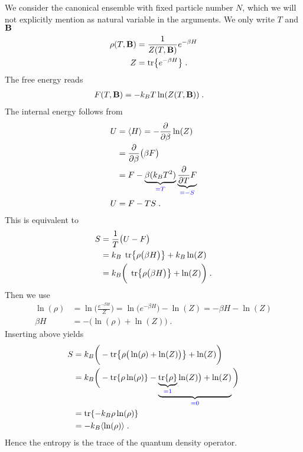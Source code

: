 We consider the canonical ensemble with fixed particle number $N$, which we will not explicitly mention as natural variable in the arguments. We only write $T$ and $\mathbf B$
%
\begin{align*}
\rho(T,\mathbf B) &= \frac{1}{Z(T,\mathbf B)} e^{-\beta H}\\
Z &= \tr{e^{-\beta H}}\;.
\end{align*}
%
The free energy reads
%
\begin{align}\label{eq:}
F(T,\mathbf B) &= -k_{B} T \ln(Z(T,\mathbf B))\;.
\end{align}
%
The internal energy follows from
%
\begin{align*}
U &=\langle H \rangle = -\frac{\partial }{\partial \beta} \ln(Z)\\
&= \frac{\partial }{\partial \beta} \big(\beta F\big) \\
&= F  - \underbrace{
\beta (k_{B}T^{2})
}_{\color{blue} = T}\underbrace{
\frac{\partial }{\partial T}  F 
}_{\color{blue} = -S}\\
U &= F-TS\;.
\end{align*}
%
This is equivalent to
%
\begin{align*}
 S &=\frac{1}{T}\big( U- F \big)\\
  &=k_{B} \;\tr{ \rho \big(\beta H\big)}  + k_{B} \ln(Z)\\
    &=k_{B} \bigg(\;\tr{ \rho \big(\beta H\big)}  +  \ln(Z)\bigg)\;.
\end{align*}
%
Then we use 
%
\begin{align*}
\ln(\rho) 
&= \ln\bigg( \frac{e^{-\beta H}}{Z} \bigg) 
= \ln\bigg( e^{-\beta H}\bigg) -\ln(Z)
= -\beta H -\ln(Z)\\
\beta H &= -\bigg( \ln(\rho) +\ln(Z) \bigg)\;.
\end{align*}
%
Inserting above yields
%
\begin{align*}
S 
&= k_{B}\bigg( -\tr{\rho\big( \ln(\rho) + \ln(Z) \big)} + \ln(Z) \bigg)\\
&= k_{B}\bigg( -\tr{\rho\ln(\rho)} -   \underbrace{
\underbrace{
\tr{\rho}
}_{\color{blue} = 1}\ln(Z) \big) + \ln(Z)
}_{\color{blue} = 0} \bigg)\\
&= \tr{ -k_{B} \rho\ln(\rho)} \\
&=-k_{B} \langle \ln(\rho)\rangle\;.
\end{align*}
%
Hence the entropy is the trace of the quantum density operator.





